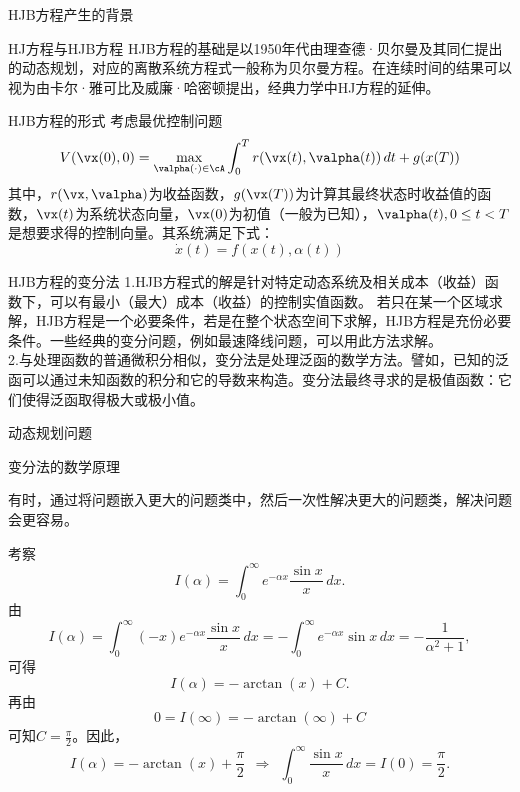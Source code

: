 \begin{frame}{HJB方程产生的背景}
\small
\begin{block}{HJ方程与HJB方程}
HJB方程的基础是以1950年代由理查德·贝尔曼及其同仁提出的动态规划，对应的离散系统方程式一般称为贝尔曼方程。在连续时间的结果可以视为由卡尔·雅可比及威廉·哈密顿提出，经典力学中HJ方程的延伸。

\end{block}

\begin{block}{HJB方程的形式}
 考虑最优控制问题
\begin{equation}
 V(\vx(0),0)=\max_{\valpha(\cdot)\in\cA} 
 \int^T_0r(\vx(t),\valpha(t))\,dt+g(x(T))
\end{equation}
 其中，$r(\vx,\valpha)$为收益函数，$g(\vx(T))$为计算其最终状态时收益值的函数，$\vx(t)$为系统状态向量，$\vx(0)$为初值（一般为已知），$\valpha(t),0\le t<T$是想要求得的控制向量。其系统满足下式：
\begin{equation}
 \dot{x}(t)=f(x(t),\alpha (t))
\end{equation}                 
\end{block}

\begin{block}{HJB方程的变分法}
1.HJB方程式的解是针对特定动态系统及相关成本（收益）函数下，可以有最小（最大）成本（收益）的控制实值函数。
若只在某一个区域求解，HJB方程是一个必要条件，若是在整个状态空间下求解，HJB方程是充份必要条件。一些经典的变分问题，例如最速降线问题，可以用此方法求解。\\
2.与处理函数的普通微积分相似，变分法是处理泛函的数学方法。譬如，已知的泛函可以通过未知函数的积分和它的导数来构造。变分法最终寻求的是极值函数：它们使得泛函取得极大或极小值。
\end{block}
\end{frame}


\begin{frame}{动态规划问题}
\small
\begin{block}{变分法的数学原理}

有时，通过将问题嵌入更大的问题类中，然后一次性解决更大的问题类，解决问题会更容易。
\end{block}

\begin{example}
考察
$$
I(\alpha) = \int_0^\infty e^{-\alpha x}\frac{\sin x}{x}\,dx.
$$
由
$$
I(\alpha) = \int_0^\infty (-x) e^{-\alpha x}\frac{\sin x}{x}\,dx = - \int_0^\infty e^{-\alpha x}\sin x\,dx
= -\frac{1}{\alpha^2+1}, 
$$
可得
$$
I(\alpha) = -\arctan(x)+C.
$$
再由
$$
0 = I(\infty) = -\arctan(\infty)+C
$$
可知$C=\frac\pi2$。因此，
$$
I(\alpha) = -\arctan(x)+\frac{\pi}{2} ~~\Longrightarrow~~
\int_0^\infty \frac{\sin x}{x}\,dx=I(0) = \frac{\pi}{2}.
$$
\end{example}
\end{frame}

